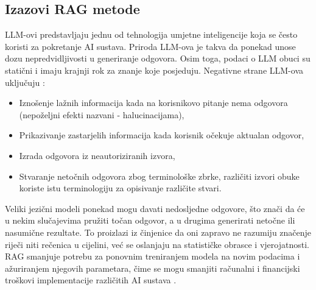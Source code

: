 \documentclass[]{foi}
\begin{document}
\subsection{Izazovi RAG metode}
LLM-ovi predstavljaju jednu od tehnologija umjetne inteligencije koja se često koristi za pokretanje AI sustava. Priroda LLM-ova je takva da ponekad unose dozu nepredvidljivosti
u generiranje odgovora. Osim toga, podaci o LLM obuci su statični i imaju krajnji rok za znanje koje posjeduju. Negativne strane LLM-ova uključuju \cite{awsRAG2025}:

\begin{itemize}
    \item Iznošenje lažnih informacija kada na korisnikovo pitanje nema odgovora (nepoželjni efekti nazvani - halucinacijama), 
    \item Prikazivanje zastarjelih informacija kada korisnik očekuje aktualan odgovor,
    \item Izrada odgovora iz neautoriziranih izvora,
    \item Stvaranje netočnih odgovora zbog terminološke zbrke, različiti izvori obuke koriste istu terminologiju za opisivanje različite stvari.
\end{itemize}

Veliki jezični modeli ponekad mogu davati nedosljedne odgovore, što znači da će u nekim slučajevima pružiti točan odgovor, a u drugima generirati netočne ili nasumične rezultate.
To proizlazi iz činjenice da oni zapravo ne razumiju značenje riječi niti rečenica u cijelini, već se oslanjaju na statističke obrasce i vjerojatnosti. RAG smanjuje potrebu za ponovnim
treniranjem modela na novim podacima i ažuriranjem njegovih parametara, čime se mogu smanjiti računalni i financijski troškovi implementacije različitih AI sustava \cite{ibmRAG}.
\end{document}
